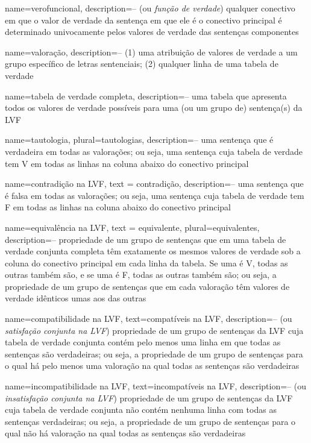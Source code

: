 {
 name=verofuncional,
 description={-- (ou \textit{função de verdade}) qualquer conectivo em que o valor de verdade da sentença em que ele é o conectivo principal é determinado univocamente pelos valores de verdade das sentenças componentes}
}

{
 name=valoração,
 description={-- (1) uma atribuição de valores de verdade a um grupo específico de letras sentenciais; (2) qualquer linha de uma tabela de verdade}
}

{
 name=tabela de verdade completa,
 description={-- uma tabela que apresenta todos os valores de verdade possíveis para uma (ou um grupo de) sentença(s) da LVF}
}

{
 name=tautologia,
 plural=tautologias,
 description={-- uma sentença que é verdadeira em todas as valorações; ou seja, uma sentença cuja tabela de verdade tem V em todas as linhas na coluna abaixo do conectivo principal}
}

{
 name=contradição na LVF,
 text = contradição,
 description={-- uma sentença que é falsa em todas as valorações; ou seja, uma sentença cuja tabela de verdade tem F em todas as linhas na coluna abaixo do conectivo principal}
}

{
 name=equivalência na LVF,
 text = equivalente,
 plural=equivalentes,
 description={-- propriedade de um grupo de sentenças que em uma tabela de verdade conjunta completa têm exatamente os mesmos valores de verdade sob a coluna do conectivo principal em cada linha da tabela. Se uma é V, todas as outras também são, e se uma é F, todas as outras também são; ou seja, a propriedade de um grupo de sentenças que em cada valoração têm valores de verdade idênticos umas aos das outras}
}

{
 name=compatibilidade na LVF,
 text=compatíveis na LVF,
 description={-- (ou \textit{satisfação conjunta na LVF}) propriedade de um grupo de sentenças da LVF cuja tabela de verdade conjunta contém pelo menos uma linha em que todas as sentenças são verdadeiras; ou seja, a propriedade de um grupo de sentenças para o qual há pelo menos uma valoração na qual todas as sentenças são verdadeiras}
}

{
 name=incompatibilidade na LVF,
 text=incompatíveis na LVF,
 description={-- (ou \textit{insatisfação conjunta na LVF}) propriedade de um grupo de sentenças da LVF cuja tabela de verdade conjunta não contém nenhuma linha com todas as sentenças verdadeiras; ou seja, a propriedade de um grupo de sentenças para o qual não há valoração na qual todas as sentenças são verdadeiras}
}

